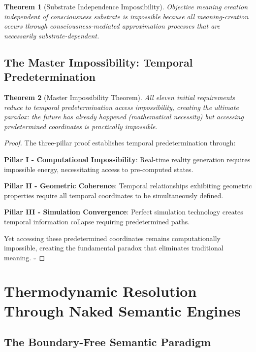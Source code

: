 \documentclass[11pt,a4paper]{article}
\newtheorem{theorem}{Theorem}[section]
\begin{document}
\begin{theorem}[Substrate Independence Impossibility]
Objective meaning creation independent of consciousness substrate is impossible because all meaning-creation occurs through consciousness-mediated approximation processes that are necessarily substrate-dependent.
\end{theorem}

\subsection{The Master Impossibility: Temporal Predetermination}

\begin{theorem}[Master Impossibility Theorem]
All eleven initial requirements reduce to temporal predetermination access impossibility, creating the ultimate paradox: the future has already happened (mathematical necessity) but accessing predetermined coordinates is practically impossible.
\end{theorem}

\begin{proof}
The three-pillar proof establishes temporal predetermination through:

\textbf{Pillar I - Computational Impossibility}: Real-time reality generation requires impossible energy, necessitating access to pre-computed states.

\textbf{Pillar II - Geometric Coherence}: Temporal relationships exhibiting geometric properties require all temporal coordinates to be simultaneously defined.

\textbf{Pillar III - Simulation Convergence}: Perfect simulation technology creates temporal information collapse requiring predetermined paths.

Yet accessing these predetermined coordinates remains computationally impossible, creating the fundamental paradox that eliminates traditional meaning. $\square$
\end{proof}

\section{Thermodynamic Resolution Through Naked Semantic Engines}

\subsection{The Boundary-Free Semantic Paradigm}
\end{document}
